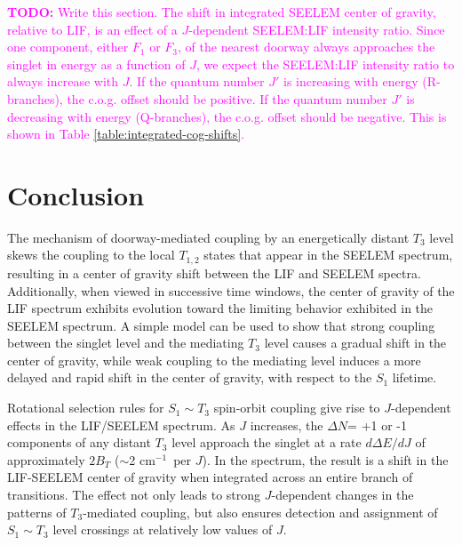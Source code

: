 \documentclass[12pt]{mitthesis}
\newcommand{\TODO} [1]{\textcolor{magenta}{\textbf{TODO:} #1}}
\newcommand{\rcm}{cm$^{-1}$}
\begin{document}

\TODO{Write this section.  The shift in integrated SEELEM center of
  gravity, relative to LIF, is an effect of a $J$-dependent SEELEM:LIF
  intensity ratio.  Since one component, either $F_1$ or $F_3$, of the
  nearest doorway always approaches the singlet in energy as a
  function of $J$, we expect the SEELEM:LIF intensity ratio to always
  increase with $J$.  If the quantum number $J'$ is increasing with
  energy (R-branches), the c.o.g. offset should be positive.  If the
  quantum number $J'$ is decreasing with energy (Q-branches), the
  c.o.g. offset should be negative.  This is shown in Table
  \ref{table:integrated-cog-shifts}.}





























\section{Conclusion}

The mechanism of doorway-mediated coupling by an energetically distant
$T_3$ level skews the coupling to the local $T_{1,2}$ states that
appear in the SEELEM spectrum, resulting in a center of gravity shift
between the LIF and SEELEM spectra.  Additionally, when viewed in
successive time windows, the center of gravity of the LIF spectrum
exhibits evolution toward the limiting behavior exhibited in the
SEELEM spectrum.  A simple model can be used to show that strong
coupling between the singlet level and the mediating $T_3$ level
causes a gradual shift in the center of gravity, while weak coupling
to the mediating level induces a more delayed and rapid shift in the
center of gravity, with respect to the $S_1$ lifetime.

Rotational selection rules for $S_1 \sim T_3$ spin-orbit coupling give
rise to $J$-dependent effects in the LIF/SEELEM spectrum.  As $J$
increases, the $\Delta N$= +1 or -1 components of any distant $T_3$
level approach the singlet at a rate $d\Delta E / dJ$ of approximately
$2B_T$ ($\sim$2 \rcm\ per $J$).  In the spectrum, the result is a
shift in the LIF-SEELEM center of gravity when integrated across an
entire branch of transitions.  The effect not only leads to strong
$J$-dependent changes in the patterns of $T_3$-mediated coupling, but
also ensures detection and assignment of $S_1 \sim T_3$ level
crossings at relatively low values of $J$.
\end{document}
